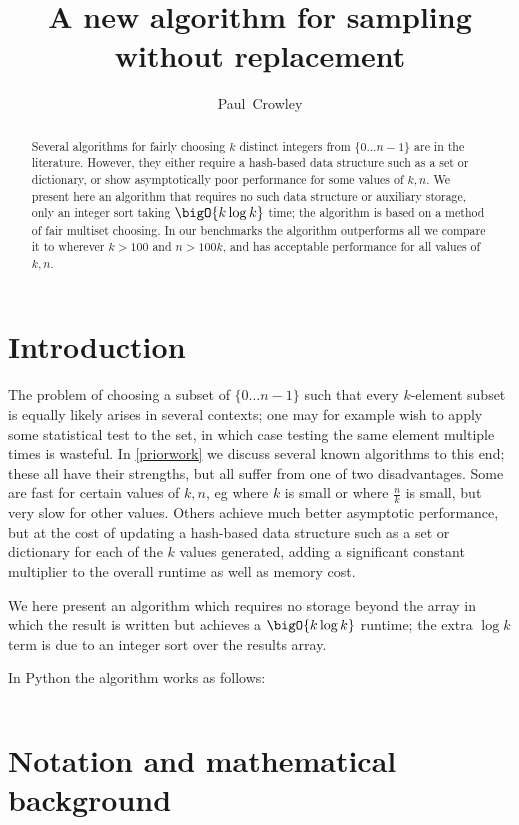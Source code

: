 \documentclass[letterpaper,luatex,11pt]{article}
\title{A new algorithm for sampling without replacement}
\author{Paul~Crowley}
\affil{Google LLC}
\begin{document}
\maketitle
\begin{abstract}
    Several algorithms for fairly choosing $k$ distinct integers from $\{0 \ldots n-1\}$ are in the literature.
    However, they either require a hash-based data structure such as a set or dictionary, or
    show asymptotically poor performance for some values of $k, n$. We present here an algorithm
    that requires no such data structure or auxiliary storage, only an integer sort taking
    $\bigO{k \log k}$ time; the algorithm is based on a method of fair multiset choosing.
    In our benchmarks the algorithm outperforms all we compare it to wherever
    \(k > 100\) and \(n > 100k\), and has acceptable performance for all values of \(k, n\).
\end{abstract}

\section{Introduction}

The problem of choosing a subset of $\{0 \ldots n-1\}$ such that every \(k\)-element subset is
equally likely arises in several contexts; one may for example wish to apply some statistical
test to the set, in which case testing the same element multiple times is wasteful.
In \autoref{priorwork} we discuss several known algorithms to this end; these all have
their strengths, but all suffer from one of two disadvantages. Some are fast for certain
values of \(k, n\), eg where \(k\) is small or where \(\frac{n}{k}\) is small, but very slow
for other values. Others achieve much better asymptotic performance, but at the cost of
updating a hash-based data structure such as a set or dictionary for each of the \(k\) values
generated, adding a significant constant multiplier to the overall runtime as well as memory cost.

We here present an algorithm which requires no storage beyond the array in which the result
is written but achieves a \(\bigO{k \log k}\) runtime; the extra \(\log k\) term is due to
an integer sort over the results array.

In Python the algorithm works as follows:

\inputminted{Python}{cardchoose.py}

\section{Notation and mathematical background}
\end{document}
